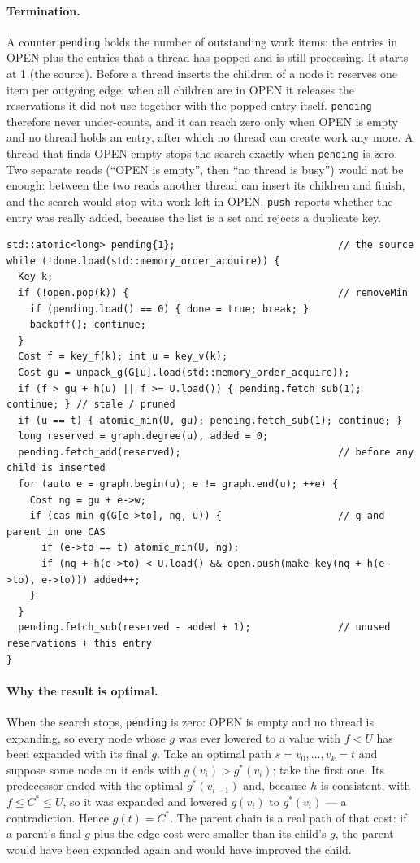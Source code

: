 \paragraph{Termination.} A counter \texttt{pending} holds the number of
outstanding work items: the entries in OPEN plus the entries that a thread has
popped and is still processing. It starts at 1 (the source). Before a thread
inserts the children of a node it reserves one item per outgoing edge; when all
children are in OPEN it releases the reservations it did not use together with
the popped entry itself. \texttt{pending} therefore never under-counts, and it
can reach zero only when OPEN is empty and no thread holds an entry, after
which no thread can create work any more. A thread that finds OPEN empty stops
the search exactly when \texttt{pending} is zero. Two separate reads (``OPEN is
empty'', then ``no thread is busy'') would not be enough: between the two reads
another thread can insert its children and finish, and the search would stop
with work left in OPEN. \texttt{push} reports whether the entry was really
added, because the list is a set and rejects a duplicate key.

\begin{lstlisting}
std::atomic<long> pending{1};                            // the source
while (!done.load(std::memory_order_acquire)) {
  Key k;
  if (!open.pop(k)) {                                    // removeMin
    if (pending.load() == 0) { done = true; break; }
    backoff(); continue;
  }
  Cost f = key_f(k); int u = key_v(k);
  Cost gu = unpack_g(G[u].load(std::memory_order_acquire));
  if (f > gu + h(u) || f >= U.load()) { pending.fetch_sub(1); continue; } // stale / pruned
  if (u == t) { atomic_min(U, gu); pending.fetch_sub(1); continue; }
  long reserved = graph.degree(u), added = 0;
  pending.fetch_add(reserved);                           // before any child is inserted
  for (auto e = graph.begin(u); e != graph.end(u); ++e) {
    Cost ng = gu + e->w;
    if (cas_min_g(G[e->to], ng, u)) {                    // g and parent in one CAS
      if (e->to == t) atomic_min(U, ng);
      if (ng + h(e->to) < U.load() && open.push(make_key(ng + h(e->to), e->to))) added++;
    }
  }
  pending.fetch_sub(reserved - added + 1);               // unused reservations + this entry
}
\end{lstlisting}

\paragraph{Why the result is optimal.} When the search stops, \texttt{pending} is
zero: OPEN is empty and no thread is expanding, so every node whose $g$ was ever lowered to a value
with $f < U$ has been expanded with its final $g$. Take an optimal path
$s = v_0, \dots, v_k = t$ and suppose some node on it ends with
$g(v_i) > g^*(v_i)$; take the first one. Its predecessor ended with the optimal
$g^*(v_{i-1})$ and, because $h$ is consistent, with
$f \le C^* \le U$, so it was expanded and lowered $g(v_i)$ to $g^*(v_i)$ ---
a contradiction. Hence $g(t) = C^*$. The parent chain is a real path of that
cost: if a parent's final $g$ plus the edge cost were smaller than its child's
$g$, the parent would have been expanded again and would have improved the
child.

